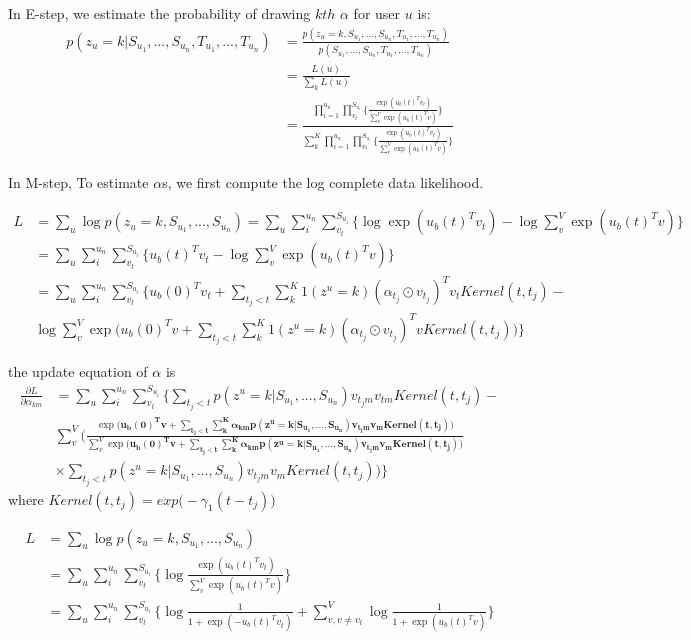 \documentclass[11pt]{article}
\begin{document}
In E-step, we estimate the probability of drawing $kth$ $\alpha$ for user $u$ is: 
\begin{align}
p(z_u=k|S_{u_1}, ..., S_{u_n}, T_{u_1}, ..., T_{u_n}) & = \frac{p(z_u=k,S_{u_1}, ..., S_{u_n}, T_{u_1}, ..., T_{u_n})}{p(S_{u_1}, ..., S_{u_n}, T_{u_1}, ..., T_{u_n})} \\
& = \frac{L(u)}{\sum_k L(u)} \\
& = \frac{\prod^{u_n}_{i=1}\prod^{S_{u_i}}_{v_t}\Big\{\frac{\exp(u_b(t)^Tv_t)}{\sum_v^{V} \exp(u_b(t)^Tv)}  \Big\}}{\sum_k^{K}\prod^{u_n}_{i=1}\prod^{S_{u_i}}_{v_t}\Big\{\frac{\exp(u_b(t)^Tv_t)}{\sum_v^V \exp(u_b(t)^Tv)} \Big\}}
\end{align}

In M-step, 
To estimate $\alpha$s, we first compute the log complete data likelihood.

\begin{align*}
L &= \sum_u \log p(z_u=k,S_{u_1}, ..., S_{u_n}) = \sum_u \sum^{u_n}_{i} \sum^{S_{u_i}}_{v_t} \Big\{\log \exp(u_b(t)^Tv_t)-\log \sum_v^V \exp(u_b(t)^Tv)\Big\} \\
& = \sum_u \sum^{u_n}_{i} \sum^{S_{u_i}}_{v_t} \Big\{ u_b(t)^Tv_t-\log \sum_v^V \exp(u_b(t)^Tv)\Big\} \\
& = \sum_u \sum^{u_n}_{i} \sum^{S_{u_i}}_{v_t}\Big\{ u_b(0)^Tv_t+\sum_{t_j<t}\sum^{K}_k 1(z^u=k)(\alpha_{t_j}\odot v_{t_j})^Tv_t Kernel(t, t_j)-\\
 &\log \sum_v^V \exp\Big(u_b(0)^Tv+\sum_{t_j<t}\sum^K_k 1(z^u=k)(\alpha_{t_j}\odot v_{t_j})^Tv Kernel(t,t_j)\Big)\Big\}
\end{align*}

the update equation of $\alpha$ is 
\begin{align}
\frac{\partial L}{\partial \alpha_{km}} &= \sum_u \sum^{u_n}_{i} \sum^{S_{u_i}}_{v_t}\Big\{\sum_{t_j<t} p(z^u=k|S_{u_1}, ..., S_{u_n})v_{t_jm}v_{tm}Kernel(t, t_j)-\\
&\sum_v^V\Big(\frac{\exp\big( \boldsymbol{u_b(0)^Tv+\sum_{t_j<t}\sum_k^K \alpha_{km} p(z^u=k|S_{u_1}, ..., S_{u_n})v_{t_jm}v_{m} Kernel(t, t_j)}\big )}{\sum_v^V \exp\big(\boldsymbol{u_b(0)^Tv+\sum_{t_j<t} \sum_k^K \alpha_{km} p(z^u=k|S_{u_1}, ..., S_{u_n})v_{t_jm}v_{m} Kernel(t, t_j)}\big)} \\
& \times \sum_{t_j<t}p(z^u=k|S_{u_1}, ..., S_{u_n})v_{t_jm}v_{m} Kernel(t, t_j) \Big)
\Big\}
\end{align}
where $Kernel(t, t_j)=exp\big(-\gamma_1 (t-t_j)\big)$


\newpage

\begin{align*}
L &= \sum_u \log p(z_u=k,S_{u_1}, ..., S_{u_n})  \\
& = \sum_u \sum^{u_n}_{i} \sum^{S_{u_i}}_{v_t} \Big\{ \log \frac{\exp(u_b(t)^Tv_t)}{\sum_v^V \exp(u_b(t)^Tv)} \Big\} \\
& = \sum_u \sum^{u_n}_{i} \sum^{S_{u_i}}_{v_t} \Big\{\log \frac{1}{1+\exp(-u_b(t)^Tv_t)} + \sum_{v,v\neq v_t}^V \log\frac{1}{1+\exp(u_b(t)^Tv)} \Big\} 
\end{align*}
\end{document}

